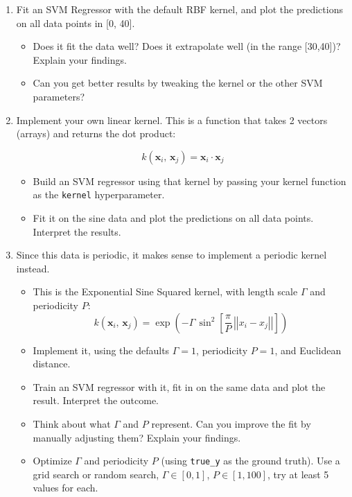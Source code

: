 \documentclass[11pt]{article}
\providecommand{\tightlist}{%
      \setlength{\itemsep}{0pt}\setlength{\parskip}{0pt}}
\begin{document}
    \begin{enumerate}
\def\labelenumi{\arabic{enumi}.}
\item
  Fit an SVM Regressor with the default RBF kernel, and plot the
  predictions on all data points in {[}0, 40{]}.

  \begin{itemize}
  \tightlist
  \item
    Does it fit the data well? Does it extrapolate well (in the range
    {[}30,40{]})? Explain your findings.
  \item
    Can you get better results by tweaking the kernel or the other SVM
    parameters?
  \end{itemize}
\item
  Implement your own linear kernel. This is a function that takes 2
  vectors (arrays) and returns the dot product:

  \[k(\mathbf{x}_i,\,\mathbf{x}_j) = \mathbf{x}_i \cdot \mathbf{x}_j\]

  \begin{itemize}
  \tightlist
  \item
    Build an SVM regressor using that kernel by passing your kernel
    function as the \texttt{kernel} hyperparameter.
  \item
    Fit it on the sine data and plot the predictions on all data points.
    Interpret the results.
  \end{itemize}
\item
  Since this data is periodic, it makes sense to implement a periodic
  kernel instead.

  \begin{itemize}
  \tightlist
  \item
    This is the Exponential Sine Squared kernel, with length scale
    \(\Gamma\) and periodicity \(P\):
    \[k(\mathbf{x}_i,\,\mathbf{x}_j) = \exp \left( -\Gamma\,\sin^2\left[\frac{\pi}{P}\,\left|\left|x_i-x_j\right|\right|\right]\right)\]
  \item
    Implement it, using the defaults \(\Gamma=1\), periodicity \(P=1\),
    and Euclidean distance.
  \item
    Train an SVM regressor with it, fit in on the same data and plot the
    result. Interpret the outcome.
  \item
    Think about what \(\Gamma\) and \(P\) represent. Can you improve the
    fit by manually adjusting them? Explain your findings.
  \item
    Optimize \(\Gamma\) and periodicity \(P\) (using \texttt{true\_y} as
    the ground truth). Use a grid search or random search,
    \(\Gamma \in [0,1]\), \(P \in [1,100]\), try at least 5 values for
    each.
  \end{itemize}
\end{enumerate}
\end{document}
